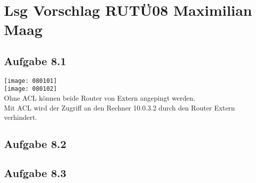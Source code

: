 \documentclass{article}
\begin{document}
	\section*{Lsg Vorschlag RUTÜ08 Maximilian Maag}
	\subsection*{Aufgabe 8.1}
	\texttt{[image: 080101]} \\
	\texttt{[image: 080102]} \\
	Ohne ACL können beide Router von Extern angepingt werden. \\
	Mit ACL wird der Zugriff an den Rechner 10.0.3.2 durch den Router Extern verhindert.
	\subsection*{Aufgabe 8.2}
	
	\subsection*{Aufgabe 8.3}
\end{document}
